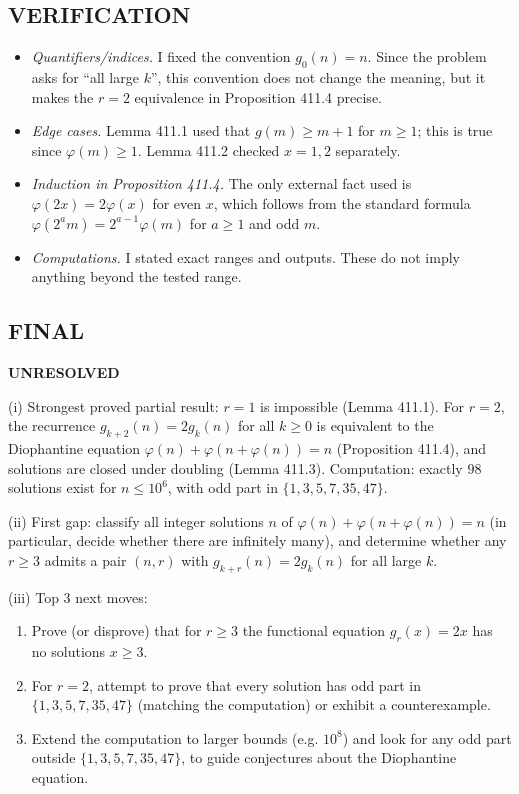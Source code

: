 \subsection*{VERIFICATION}
\begin{itemize}
  \item \emph{Quantifiers/indices.} I fixed the convention $g_0(n)=n$. Since the problem asks for ``all large $k$'', this convention does not change the meaning, but it makes the $r=2$ equivalence in Proposition 411.4 precise.
  \item \emph{Edge cases.} Lemma 411.1 used that $g(m)\ge m+1$ for $m\ge1$; this is true since $\varphi(m)\ge 1$. Lemma 411.2 checked $x=1,2$ separately.
  \item \emph{Induction in Proposition 411.4.} The only external fact used is $\varphi(2x)=2\varphi(x)$ for even $x$, which follows from the standard formula $\varphi(2^a m)=2^{a-1}\varphi(m)$ for $a\ge1$ and odd $m$.
  \item \emph{Computations.} I stated exact ranges and outputs. These do not imply anything beyond the tested range.
\end{itemize}

\subsection*{FINAL}
\textbf{UNRESOLVED}

(i) Strongest proved partial result: $r=1$ is impossible (Lemma 411.1). For $r=2$, the recurrence $g_{k+2}(n)=2g_k(n)$ for all $k\ge0$ is equivalent to the Diophantine equation $\varphi(n)+\varphi(n+\varphi(n))=n$ (Proposition 411.4), and solutions are closed under doubling (Lemma 411.3). Computation: exactly $98$ solutions exist for $n\le10^6$, with odd part in $\{1,3,5,7,35,47\}$.

(ii) First gap: classify all integer solutions $n$ of $\varphi(n)+\varphi(n+\varphi(n))=n$ (in particular, decide whether there are infinitely many), and determine whether any $r\ge3$ admits a pair $(n,r)$ with $g_{k+r}(n)=2g_k(n)$ for all large $k$.

(iii) Top 3 next moves:
\begin{enumerate}
  \item Prove (or disprove) that for $r\ge3$ the functional equation $g_r(x)=2x$ has no solutions $x\ge3$.
  \item For $r=2$, attempt to prove that every solution has odd part in $\{1,3,5,7,35,47\}$ (matching the computation) or exhibit a counterexample.
  \item Extend the computation to larger bounds (e.g. $10^8$) and look for any odd part outside $\{1,3,5,7,35,47\}$, to guide conjectures about the Diophantine equation.
\end{enumerate}

